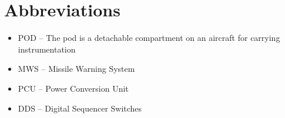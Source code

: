 \documentclass[Main]{subfiles}
\begin{document}
\section{Abbreviations}

\begin{itemize}

\item POD -- The pod is a detachable compartment on an aircraft for carrying instrumentation

\item MWS -- Missile Warning System

\item PCU -- Power Conversion Unit

\item DDS -- Digital Sequencer Switches

\end{itemize}
\end{document}
